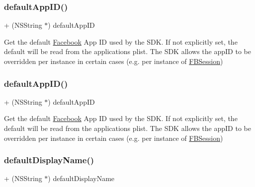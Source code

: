 \subsubsection{\texorpdfstring{default\+App\+I\+D()}{defaultAppID()}\hspace{0.1cm}{\footnotesize\ttfamily [4/5]}}
{\footnotesize\ttfamily + (N\+S\+String $\ast$) default\+App\+ID \begin{DoxyParamCaption}{ }\end{DoxyParamCaption}}

Get the default \hyperlink{interfaceFacebook}{Facebook} App ID used by the S\+DK. If not explicitly set, the default will be read from the application\textquotesingle{}s plist. The S\+DK allows the app\+ID to be overridden per instance in certain cases (e.\+g. per instance of \hyperlink{interfaceFBSession}{F\+B\+Session}) \mbox{\label{interfaceFBSettings_af60cce044316df28d128d64e79a77ba5}} 
\subsubsection{\texorpdfstring{default\+App\+I\+D()}{defaultAppID()}\hspace{0.1cm}{\footnotesize\ttfamily [5/5]}}
{\footnotesize\ttfamily + (N\+S\+String $\ast$) default\+App\+ID \begin{DoxyParamCaption}{ }\end{DoxyParamCaption}}

Get the default \hyperlink{interfaceFacebook}{Facebook} App ID used by the S\+DK. If not explicitly set, the default will be read from the application\textquotesingle{}s plist. The S\+DK allows the app\+ID to be overridden per instance in certain cases (e.\+g. per instance of \hyperlink{interfaceFBSession}{F\+B\+Session}) \mbox{\label{interfaceFBSettings_a64b1fe4c26086a1a2bb5b162815f2786}} 
\subsubsection{\texorpdfstring{default\+Display\+Name()}{defaultDisplayName()}\hspace{0.1cm}{\footnotesize\ttfamily [1/5]}}
{\footnotesize\ttfamily + (N\+S\+String $\ast$) default\+Display\+Name \begin{DoxyParamCaption}{ }\end{DoxyParamCaption}}

